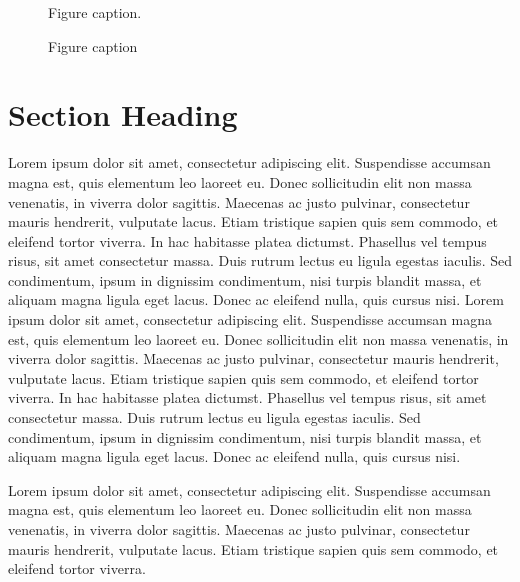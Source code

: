 \documentclass{article}
\begin{document}
\begin{figure*}
\begin{center}
\caption
{Figure caption. }
\label{fig:f1}
\end{center}
\end{figure*}

\begin{figure*}
\begin{center}
\caption
{Figure caption}
\label{fig:f2}
\end{center}
\end{figure*}


\section{Section Heading}

Lorem ipsum dolor sit amet, consectetur adipiscing elit. Suspendisse accumsan magna est, quis elementum leo laoreet eu. Donec sollicitudin elit non massa venenatis, in viverra dolor sagittis. Maecenas ac justo pulvinar, consectetur mauris hendrerit, vulputate lacus. Etiam tristique sapien quis sem commodo, et eleifend tortor viverra. In hac habitasse platea dictumst. Phasellus vel tempus risus, sit amet consectetur massa. Duis rutrum lectus eu ligula egestas iaculis. Sed condimentum, ipsum in dignissim condimentum, nisi turpis blandit massa, et aliquam magna ligula eget lacus. Donec ac eleifend nulla, quis cursus nisi. Lorem ipsum dolor sit amet, consectetur adipiscing elit. Suspendisse accumsan magna est, quis elementum leo laoreet eu. Donec sollicitudin elit non massa venenatis, in viverra dolor sagittis. Maecenas ac justo pulvinar, consectetur mauris hendrerit, vulputate lacus. Etiam tristique sapien quis sem commodo, et eleifend tortor viverra. In hac habitasse platea dictumst. Phasellus vel tempus risus, sit amet consectetur massa. Duis rutrum lectus eu ligula egestas iaculis. Sed condimentum, ipsum in dignissim condimentum, nisi turpis blandit massa, et aliquam magna ligula eget lacus. Donec ac eleifend nulla, quis cursus nisi.

Lorem ipsum dolor sit amet, consectetur adipiscing elit. Suspendisse accumsan magna est, quis elementum leo laoreet eu. Donec sollicitudin elit non massa venenatis, in viverra dolor sagittis. Maecenas ac justo pulvinar, consectetur mauris hendrerit, vulputate lacus. Etiam tristique sapien quis sem commodo, et eleifend tortor viverra.
\end{document}
